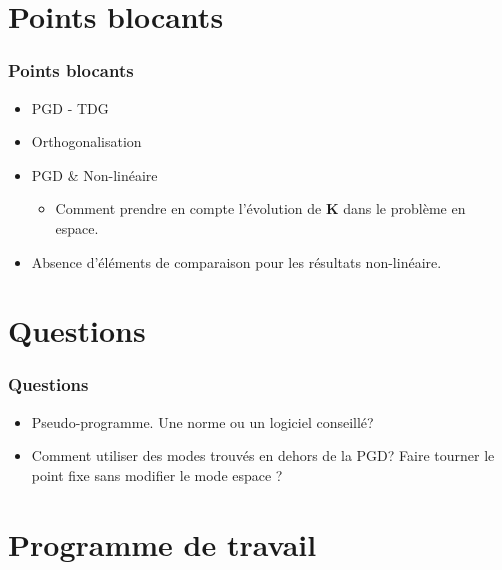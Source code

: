 \documentclass[12pt]{beamer}
\begin{document}
	
\section{Points blocants}

	\begin{frame}
	
		\frametitle{Points blocants}
		
		\begin{itemize}
			\item PGD - TDG
			\item Orthogonalisation
			\item PGD \& Non-linéaire
				\begin{itemize} 
					\item Comment prendre en compte l'évolution de $ \mathbf{K} $ dans le problème en espace.
				\end{itemize}
			\item Absence d'éléments de comparaison pour les résultats non-linéaire.
		\end{itemize}
	
	\end{frame}

\section{Questions}

	\begin{frame}
	
		\frametitle{Questions}
		
		\begin{itemize}
			\item Pseudo-programme. Une norme ou un logiciel conseillé?
			\item Comment utiliser des modes trouvés en dehors de la PGD? Faire tourner le point fixe sans modifier le mode espace ?
		\end{itemize}
	
	\end{frame}
	
\section{Programme de travail}
\end{document}
